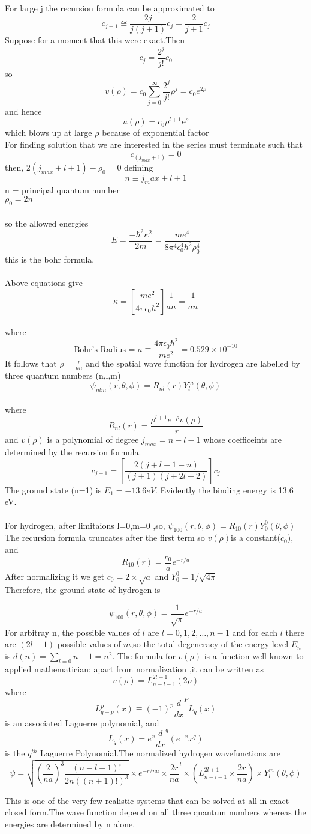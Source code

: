 \documentclass[12pt]{article}
\begin{document}
For large j the recursion formula can be approximated to 
$$c_{j+1} \cong \frac{2j}{j(j+1)}c_j=\frac{2}{j+1}c_j$$
Suppose for a moment that this were exact.Then
$$c_j=\frac{2^j}{j!}c_0$$ 
so 
$$v(\rho)=c_0\sum_{j=0}^{\infty}\frac{2^j}{j!}\rho^j=c_0e^{2\rho}$$
and hence 
$$u(\rho)=c_0\rho^{l+1}e^\rho$$
 which blows up at large $\rho$ because of exponential factor \\
For finding solution that we are interested in the series must terminate such that\\ 
$$c_{(j_{max} +1)}=0 $$ 
then,  $2(j_{max} +l+1)-\rho_0=0$ 
defining
$$n\equiv j_max +l+1$$ 
n = principal quantum number\\
$\rho_0=2n$\\ \\
so the allowed energies 
$$E=\frac{-\hbar^2\kappa^2}{2m}=\frac{me^4}{8\pi^4\epsilon_0^4 \hbar^2 \rho_0^4}$$
this is the bohr formula.\\ \\
Above equations give $$\kappa=\left[\frac{me^2}{4\pi\epsilon_0 \hbar^2}\right]\frac{1}{an}=\frac{1}{an}$$\\
where $$\text{Bohr's Radius = }a\equiv\frac{4\pi\epsilon_0 \hbar^2}{me^2}=0.529 \times 10^{-10}$$
It follows that 
$\rho =\frac{r}{an}$
and the spatial wave function for hydrogen are labelled by three quantum numbers (n,l,m)
$$\psi_{nlm}(r,\theta,\phi)=R_{nl}(r)Y^m_l(\theta,\phi)$$  \\
where 
$$R_{nl}(r)=\frac{\rho^{l+1}e^{-\rho}v(\rho)}{r}$$
and $v(\rho)$  is a polynomial of degree $ j_{max}=n-l-1 $ whose coefficeints are determined by the recursion formula.
$$c_{j+1}=\left[\frac{2(j+l+1-n)}{(j+1)(j+2l+2)}\right]c_j$$
The ground state (n=1) is 
$E_1=-13.6eV$.
Evidently the binding energy is 13.6 eV.\\\\
For hydrogen,  after limitaions l=0,m=0 ,so,
$\psi_{100}(r,\theta,\phi)=R_{10}(r)Y^0_0(\theta,\phi)$  \\
The recursion formula truncates after the first term so $v(\rho) $is a constant($c_0$), and \\
$$R_{10}(r)=\frac{c_0}{a}e^{-r/a}$$ 
After normalizing it we get $c_0 =2\times \sqrt{a}$ and  $Y^{0}_0 =1/{\sqrt{4\pi}}$\\
Therefore, the ground state of hydrogen is 

$$\psi_{100}(r,\theta,\phi)=\frac{1}{\sqrt{\pi}}e^{-r/a}$$
For arbitray n, the possible values of $l$ are
 $l=0,1,2,\ldots,n-1$
and for each $l$ there are $(2l+1)$ possible values of $m$,so the total degeneracy of the energy level $E_n$ is
$d(n)=\sum_{l=0}{n-1}=n^2$.
The formula for $v(\rho)$ is a function well known to applied mathematician; apart from normalization ,it can be written as
$$v(\rho)=L^{2l+1}_{n-l-1}(2\rho)$$
where 
$$L^{p}_{q-p}(x) \equiv (-1)^p\frac{d}{dx}^P L_q(x)$$
is an associated Laguerre polynomial, and
$$ L_q(x)=e^x{\frac{d}{dx}}^q (e^{-x}x^q)$$
is the $q^{th}$ Laguerre Polynomial.The normalized hydrogen wavefunctions are 
$$\psi=\sqrt{\left(\frac{2}{na}\right)^3 {\frac{(n-l-1)!}{2n((n+1)!)^3}}}
 \times e^{-r/na}\times{\frac{2r}{na}}^l\times  \left(L^{2l+1}_{n-l-1}\times\frac{2r}{na}\right)\times Y^{m}_l(\theta,\phi)$$ 



This is one of the very few realistic systems that can be solved at all in exact closed form.The wave function depend on all three
quantum numbers whereas the energies are determined by n alone.\\
\end{document}
